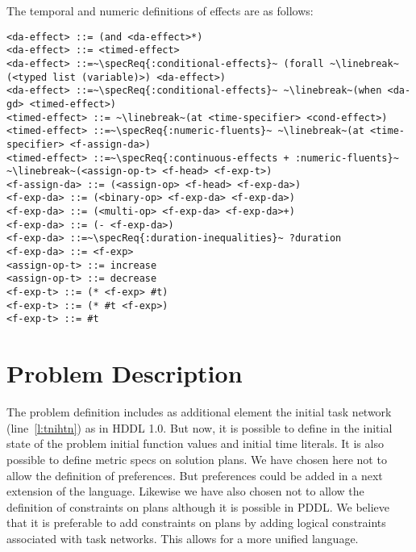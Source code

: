 \documentclass{article}
\begin{document}
%
%

\noindent The temporal and numeric definitions of effects are as follows:

\begin{lstlisting}[firstnumber=last, escapechar=~]
<da-effect> ::= (and <da-effect>*)
<da-effect> ::= <timed-effect>
<da-effect> ::=~\specReq{:conditional-effects}~ (forall ~\linebreak~(<typed list (variable)>) <da-effect>)
<da-effect> ::=~\specReq{:conditional-effects}~ ~\linebreak~(when <da-gd> <timed-effect>)
<timed-effect> ::= ~\linebreak~(at <time-specifier> <cond-effect>) 
<timed-effect> ::=~\specReq{:numeric-fluents}~ ~\linebreak~(at <time-specifier> <f-assign-da>)
<timed-effect> ::=~\specReq{:continuous-effects + :numeric-fluents}~ ~\linebreak~(<assign-op-t> <f-head> <f-exp-t>)
<f-assign-da> ::= (<assign-op> <f-head> <f-exp-da>)
<f-exp-da> ::= (<binary-op> <f-exp-da> <f-exp-da>)
<f-exp-da> ::= (<multi-op> <f-exp-da> <f-exp-da>+)
<f-exp-da> ::= (- <f-exp-da>)
<f-exp-da> ::=~\specReq{:duration-inequalities}~ ?duration
<f-exp-da> ::= <f-exp>
<assign-op-t> ::= increase
<assign-op-t> ::= decrease
<f-exp-t> ::= (* <f-exp> #t)
<f-exp-t> ::= (* #t <f-exp>)
<f-exp-t> ::= #t
\end{lstlisting}

\section{Problem Description}

%
% 
The problem definition includes as additional element the initial task network (line~\ref{l:tnihtn}) as in HDDL 1.0. But now, it is possible to define in the initial state of the problem initial function values and initial time literals. It is also possible to define metric specs on solution plans. We have chosen here not to allow the definition of preferences. But preferences could be added in a next extension of the language. Likewise we have also chosen not to allow the definition of constraints on plans although it is possible in PDDL. We believe that it is preferable to add constraints on plans by adding logical constraints associated with task networks. This allows for a more unified language.
\end{document}

